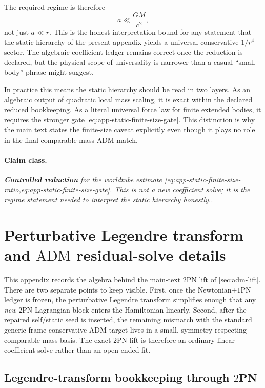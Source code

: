 \documentclass[11pt]{article}
\newcommand{\OnePN}{\mathrm{1PN}}
\newcommand{\TwoPN}{\mathrm{2PN}}
\newcommand{\ADM}{\mathrm{ADM}}
\newcommand{\Controlled}{\textbf{Controlled reduction}}
\newcommand{\claimclass}[1]{\paragraph{Claim class.}\emph{#1.}}
\begin{document}
The required regime is therefore
\begin{equation}
a\ll \frac{GM}{c^2},
\label{eq:app-static-finite-size-gate}
\end{equation}
not just \(a\ll r\).
This is the honest interpretation bound for any statement that the static hierarchy of the
present appendix yields a universal conservative \(1/r^4\) sector.  The algebraic
coefficient ledger remains correct once the reduction is declared, but the physical scope
of universality is narrower than a casual ``small body'' phrase might suggest.

In practice this means the static hierarchy should be read in two layers.  As an
algebraic output of quadratic local mass scaling, it is exact within the declared reduced
bookkeeping.  As a literal universal force law for finite extended bodies, it requires the
stronger gate \cref{eq:app-static-finite-size-gate}.  This distinction is why the main
text states the finite-size caveat explicitly even though it plays no role in the final
comparable-mass \(\ADM\) match.

\claimclass{\Controlled{} for the worldtube estimate
\cref{eq:app-static-finite-size-ratio,eq:app-static-finite-size-gate}.  This is not a new
coefficient solve; it is the regime statement needed to interpret the static hierarchy
honestly.}


\section{Perturbative Legendre transform and \texorpdfstring{$\ADM$}{ADM} residual-solve details}
\label{app:adm-details}

This appendix records the algebra behind the main-text \(\TwoPN\) lift of
\cref{sec:adm-lift}.  There are two separate points to keep visible.
First, once the Newtonian+\(\OnePN\) ledger is frozen, the perturbative Legendre
transform simplifies enough that any \emph{new} \(\TwoPN\) Lagrangian block enters the
Hamiltonian linearly.  Second, after the repaired self/static seed is inserted, the
remaining mismatch with the standard generic-frame conservative \(\ADM\) target lives in a
small, symmetry-respecting comparable-mass basis.  The exact \(\TwoPN\) lift is therefore
an ordinary linear coefficient solve rather than an open-ended fit.

\subsection{Legendre-transform bookkeeping through \texorpdfstring{$2$}{2}PN}
\label{app:adm-legendre-details}
\end{document}
